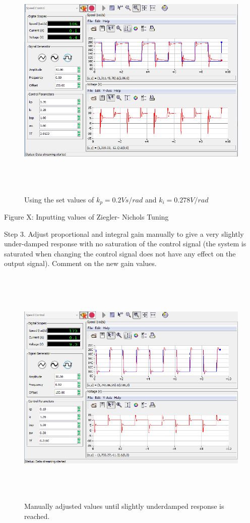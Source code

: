 \documentclass[]{article}
\begin{document}
\begin{figure}\includegraphics[width=6.50000in,height=4.62500in]{media/image44.png} \caption{Using the set values of $k_p = 0.2 Vs/rad $ and  $k_i = 0.278 V/rad$} \end{figure}

Figure X: Inputting values of Ziegler- Nichols Tuning

Step 3. Adjust proportional and integral gain manually to give a very
slightly under-damped response with no saturation of the control signal
(the system is saturated when changing the control signal does not have
any effect on the output signal). Comment on the new gain values.

\begin{figure}\includegraphics[width=6.50000in,height=4.61111in]{media/image25.png} \caption{Manually adjusted values until slightly underdamped response is reached.} \end{figure}
\end{document}
